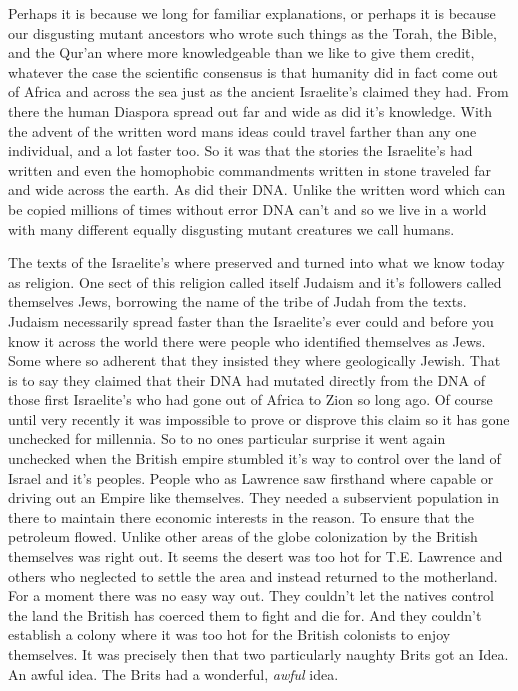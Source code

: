 \documentclass{article}
\begin{document}
Perhaps it is because we long for familiar explanations, or perhaps it is because our disgusting mutant ancestors who wrote such things as the Torah, the Bible, and the Qur'an where more knowledgeable than we like to give them credit, whatever the case the scientific consensus is that humanity did in fact come out of Africa and across the sea just as the ancient Israelite's claimed they had. From there the human Diaspora spread out far and wide as did it's knowledge. With the advent of the written word mans ideas could travel farther than any one individual, and a lot faster too. So it was that the stories the Israelite's had written and even the homophobic commandments written in stone traveled far and wide across the earth. As did their DNA. Unlike the written word which can be copied millions of times without error DNA can't and so we live in a world with many different equally disgusting mutant creatures we call humans.

The texts of the Israelite's where preserved and turned into what we know today as religion. One sect of this religion called itself Judaism and it's followers called themselves Jews, borrowing the name of the tribe of Judah from the texts. Judaism necessarily spread faster than the Israelite's ever could and before you know it across the world there were people who identified themselves as Jews. Some where so adherent that they insisted they where geologically Jewish. That is to say they claimed that their DNA had mutated directly from the DNA of those first Israelite's who had gone out of Africa to Zion so long ago. Of course until very recently it was impossible to prove or disprove this claim so it has gone unchecked for millennia. So to no ones particular surprise it went again unchecked when the British empire stumbled it's way to control over the land of Israel and it's peoples. People who as Lawrence saw firsthand where capable or driving out an Empire like themselves. They needed a subservient population in there to maintain there economic interests in the reason. To ensure that the petroleum flowed. Unlike other areas of the globe colonization by the British themselves was right out. It seems the desert was too hot for T.E. Lawrence and others who neglected to settle the area and instead returned to the motherland. For a moment there was no easy way out. They couldn't let the natives control the land the British has coerced them to fight and die for. And they couldn't establish a colony where it was too hot for the British colonists to enjoy themselves. It was precisely then that two particularly naughty Brits got an Idea. An awful idea. The Brits had a wonderful, \textit{awful} idea.
\end{document}

